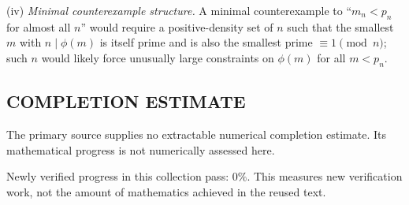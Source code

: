 (iv) \emph{Minimal counterexample structure.} A minimal counterexample to ``$m_n<p_n$ for almost all $n$'' would require a positive-density set of $n$ such that the smallest $m$ with $n\mid\phi(m)$ is itself prime and is also the smallest prime $\equiv 1\pmod n$; such $n$ would likely force unusually large constraints on $\phi(m)$ for all $m<p_n$.



\subsection*{COMPLETION ESTIMATE}
The primary source supplies no extractable numerical completion estimate. Its mathematical progress is not numerically assessed here.

Newly verified progress in this collection pass: $0\%$. This measures new verification work, not the amount of mathematics achieved in the reused text.
